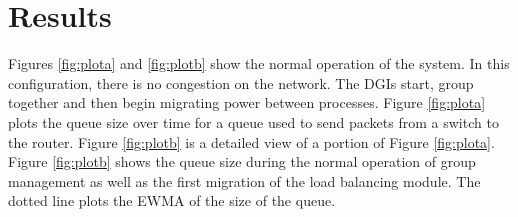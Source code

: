 





\section{Results}
\label{sect:results}
Figures \ref{fig:plota} and \ref{fig:plotb} show the normal operation of the system.
In this configuration, there is no congestion on the network. 
The \ac{DGI}s start, group together and then begin migrating power between processes.
Figure \ref{fig:plota} plots the queue size over time for a queue used to send packets from a switch to the router.
Figure \ref{fig:plotb} is a detailed view of a portion of Figure \ref{fig:plota}.
Figure \ref{fig:plotb} shows the queue size during the normal operation of group management as well as the first migration of the load balancing module.
The dotted line plots the \ac{EWMA} of the size of the queue.

